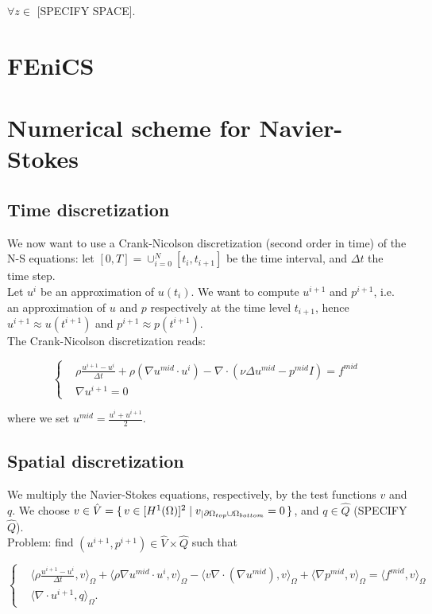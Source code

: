 \documentclass[11pt,a4paper,titlepage]{report}
\begin{document}
$\forall z \in $ [SPECIFY SPACE].






\section{FEniCS}
\section{Numerical scheme for Navier-Stokes}

\subsection{Time discretization}
We now want to use a Crank-Nicolson discretization (second order in time) of the N-S equations: let $[0, T] = \cup^N_{i=0} [t_i, t_{i+1}] $ be the time interval, and $\Delta t$ the time step. \\
Let $u^i$ be an approximation of $u(t_i)$. We want to compute $u^{i+1}$ and $p^{i+1}$, i.e. an approximation of $u$ and $p$ respectively at the time level $t_{i+1}$, hence $u^{i+1} \approx u(t^{i+1})$ and $p^{i+1} \approx p(t^{i+1})$. \\
The Crank-Nicolson discretization reads:

\[
\left\{  
\begin{aligned}
& \rho \frac{u^{i+1} - u^i}{\Delta t} + \rho (\nabla u^{mid} \cdot u^i) - \nabla \cdot (\nu \Delta u^{mid} - p^{mid}I) = f^{mid} \\
& \nabla u^{i+1} = 0
\end{aligned}
\right.
\]

where we set $u^{mid} = \frac{u^i + u^{i+1}}{2}$.

\subsection{Spatial discretization}
We multiply the Navier-Stokes equations, respectively, by the test functions $v$ and $q$. We choose $v \in \hat{V} = \set{v \in [H^1(\Omega)]^2 | v_|{_{\partial \Omega_{top} \cup \Omega_{bottom}}} = 0}$, and $q \in \hat{Q}$ (SPECIFY $\hat{Q}$). \\
Problem: find $(u^{i+1}, p^{i+1}) \in \hat{V} \times \hat{Q}$ such that 

\[
\left\{  
\begin{aligned}
& \langle \rho \frac{u^{i+1} - u^i}{\Delta t},v \rangle_\Omega
+ \langle \rho \nabla u^{mid} \cdot u^i  ,v \rangle_\Omega
- \langle v \nabla \cdot (\nabla u^{mid}) ,v \rangle_\Omega
+ \langle \nabla p^{mid} ,v \rangle_\Omega = \langle f^{mid} ,v \rangle_\Omega \\
& \langle \nabla \cdot u^{i+1},q \rangle_\Omega.
\end{aligned}
\right.
\]
\end{document}
